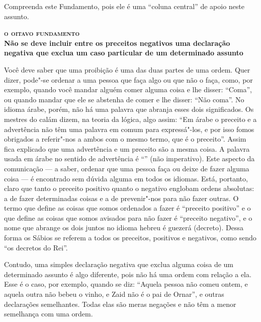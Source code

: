 Compreenda este Fundamento, pois ele é uma ``coluna central'' de apoio
neste assunto.



\bigskip

\noindent\textbf{\textsc{o oitavo fundamento}\\Não se deve incluir entre os preceitos negativos uma declaração negativa que exclua um caso particular de um determinado assunto}

\smallskip

Você deve saber que uma proibição é uma das duas partes de uma ordem.
Quer dizer, pode"-se ordenar a uma pessoa que faça algo ou que não o
faça, como, por exemplo, quando você mandar alguém comer alguma coisa e
lhe disser: ``Coma'', ou quando mandar que ele se abstenha de comer e
lhe disser: ``Não coma''. No idioma árabe, porém, não há uma palavra que
abranja esses dois significados. Os mestres do calám\starr{} dizem, na teoria da
lógica, algo assim: ``Em árabe o preceito e a advertência não têm uma
palavra em comum para expressá"-los, e por isso fomos obrigados a
referir"-nos a ambos com o mesmo termo, que é o preceito''. Assim fica
explicado que uma advertência e um preceito são a mesma coisa. A palavra
usada em árabe no sentido de advertência é ``'' (não imperativo).
Este aspecto da comunicação --- a saber, ordenar que uma pessoa faça ou
deixe de fazer alguma coisa --- é encontrado sem dúvida alguma em todos
os idiomas. Está, portanto, claro que tanto o preceito positivo quanto
o negativo englobam ordens absolutas: a de fazer determinadas coisas e
a de prevenir"-nos para não fazer outras. O termo que define as coisas
que somos ordenados a fazer é ``preceito positivo'' e o que define as
coisas que somos avisados para não fazer é ``preceito negativo'', e o
nome que abrange os dois juntos no idioma hebreu é guezerá\starr{}
(decreto). Dessa forma os Sábios se referem a todos os preceitos,
positivos e negativos, como sendo ``os decretos do Rei''.

Contudo, uma simples declaração negativa que exclua alguma coisa de um
determinado assunto é algo diferente, pois não há uma ordem com relação
a ela. Esse é o caso, por exemplo, quando se diz: ``Aquela pessoa não
comeu ontem, e aquela outra não bebeu o vinho, e Zaid não é o pai de
Ornar'', e outras declarações semelhantes. Todas elas são meras negações
e não têm a menor semelhança com uma ordem.


